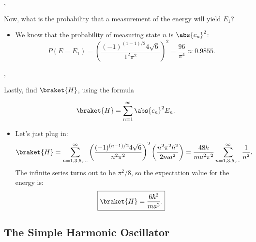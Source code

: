 \begin{example}
    \sep 

    Now, what is the probability that a measurement of the energy will yield $E_1$?

    \begin{itemize}
        \item We know that the probability of measuring state $n$ is $\abs{c_n}^2$:
            \begin{equation*}
                P(E = E_1) = \left( \frac{(-1)^{(1-1)/2} 4\sqrt{6}}{1^2\pi^2} \right)^2 = \frac{96}{\pi^4} \approx 0.9855.
            \end{equation*}
    \end{itemize}

    \sep 

    Lastly, find $\braket{H}$, using the formula

    \begin{equation}
        \braket{H} = \sum_{n=1}^{\infty} \abs{c_n}^2 E_n.
    \end{equation}

    \begin{itemize}
        \item Let's just plug in:
            \begin{equation*}
                \braket{H} = \sum_{n=1,3,5,\ldots}^{\infty} \left(\frac{(-1)^{(n-1)/2} 4\sqrt{6}}{n^2\pi^2}\right)^2 \left(\frac{n^2\pi^2\hbar^2}{2ma^2}\right) = \frac{48\hbar}{ma^2\pi^2} \sum_{n=1,3,5,\ldots}^{\infty} \frac{1}{n^2}.
            \end{equation*}
            The infinite series turns out to be $\pi^2/8$, so the expectation value for the energy is:
            \begin{equation*}
                \boxed{\braket{H} = \frac{6\hbar^2}{ma^2}.}
            \end{equation*}
    \end{itemize}
\end{example}



\subsection*{The Simple Harmonic Oscillator}



